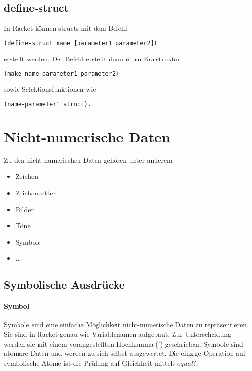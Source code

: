 \documentclass[../main.tex]{subfiles}
\begin{document}
        \subsection{define-struct}
            In Racket können structs mit dem Befehl
            \begin{lstlisting}[language=Lisp]
                (define-struct name [parameter1 parameter2])
            \end{lstlisting}
            erstellt werden. Der Befehl erstellt dann einen Konstruktor
            \begin{lstlisting}[language=Lisp]
                (make-name parameter1 parameter2)
            \end{lstlisting}
            sowie Selektionsfunktionen wie
            \begin{lstlisting}[language=Lisp]
                (name-parameter1 struct).
            \end{lstlisting}
            
    \section{Nicht-numerische Daten}
        Zu den nicht numerischen Daten gehören unter anderem
        
        \begin{itemize}
            \item Zeichen
            \item Zeichenketten
            \item Bilder
            \item Töne
            \item Symbole
            \item ...
        \end{itemize}
        
        \subsection{Symbolische Ausdrücke}
            \paragraph{Symbol}
                Symbole sind eine einfache Möglichkeit nicht-numerische Daten zu repräsentieren. Sie sind in Racket genau wie Variablenamen aufgebaut. Zur Unterscheidung werden sie mit einem vorangestellten Hochkomma (') geschrieben. Symbole sind atomare Daten und werden zu sich selbst ausgewertet. Die einzige Operation auf symbolische Atome ist die Prüfung auf Gleichheit mittels $equal?$.
                
\end{document}

